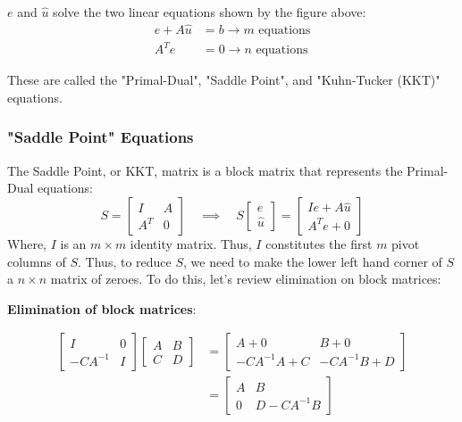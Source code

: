 \documentclass[]{article}
\begin{document}
$e$ and $\hat{u}$ solve the two linear equations shown by the figure above:
\begin{align}
e + A \hat{u} &= b \rightarrow m \textrm{ equations} \\
A^T e &= 0 \rightarrow n \textrm{ equations}
\end{align}

These are called the "Primal-Dual", "Saddle Point", and "Kuhn-Tucker (KKT)" equations. 

\subsubsection{"Saddle Point" Equations}
The Saddle Point, or KKT, matrix is a block matrix that represents the Primal-Dual equations:
$$ S = \begin{bmatrix} I & A \\ A^T & 0 \end{bmatrix} \quad \implies \quad S \begin{bmatrix} e \\ \hat{u} \end{bmatrix} = \begin{bmatrix} Ie + A\hat{u} \\ A^T e + 0 \end{bmatrix} $$ 
Where, $I$ is an $m \times m$ identity matrix. Thus, $I$ constitutes the first $m$ pivot columns of $S$. Thus, to reduce $S$, we need to make the lower left hand corner of $S$ a $n \times n$ matrix of zeroes. To do this, let's review elimination on block matrices: 

\textbf{Elimination of block matrices}: 

\begin{align}
\begin{bmatrix} I & 0 \\ -CA^{-1} & I \end{bmatrix} \begin{bmatrix} A & B \\ C & D \end{bmatrix} &= \begin{bmatrix} A + 0 & B + 0 \\ -CA^{-1}A + C & -CA^{-1}B + D \end{bmatrix} \\
&= \begin{bmatrix} A & B \\ 0 & D - CA^{-1}B \end{bmatrix} 
\end{align}
\end{document}
